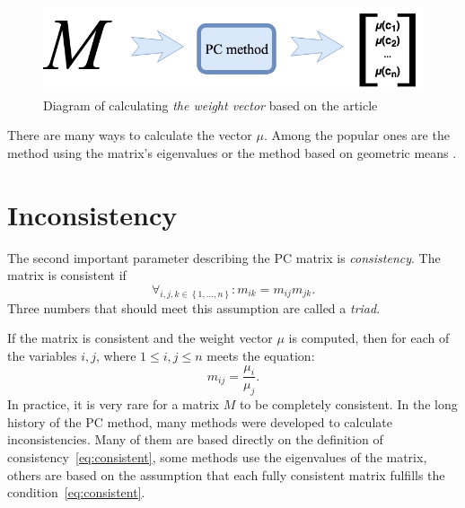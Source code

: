 \begin{figure}[ht]
\centerline{\includegraphics[scale=2.5]{fig1.png}}
\caption{Diagram of calculating \textit{the weight vector} based on the article \cite{Kulakowski2014}}
\end{figure}

There are many ways to calculate the vector $\mu$. Among the popular ones are the method using the matrix's eigenvalues or the method based on geometric means \cite{SAATY1998}.

\section{Inconsistency}
\label{subsec:inconsistency}
The second important parameter describing the PC matrix is \textit{consistency}. The matrix is consistent if 
	\begin{equation}
		\label{eq:consistent}
		\forall _{i,j,k \in\left\{ 1,\ldots,n\right\}} :m_{ik}=m_{ij}m_{jk}.
	\end{equation}
Three numbers that should meet this assumption are called a \textit{triad}.

If the matrix is consistent and the weight vector $\mu$ is computed, then for each of the variables $i,j$, where $1\leq i,j\leq n$ meets the equation: 
	\begin{equation} 
		\label{eq:consistent2}		
		m_{ij}=\frac{\mu_{i}}{\mu_{j}}.
 	\end{equation}
In practice, it is very rare for a matrix $M$ to be completely consistent. In the long history of the PC method, many methods were developed to calculate inconsistencies. Many of them are based directly on the definition of consistency~\ref{eq:consistent}, some methods use the eigenvalues of the matrix, others are based on the assumption that each fully consistent matrix fulfills the condition~\ref{eq:consistent}.